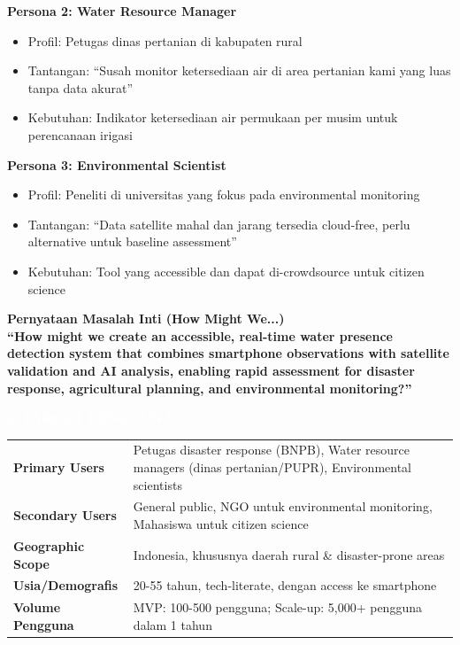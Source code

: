 \documentclass[12pt,a4paper]{article}
\newcommand{\sectionbox}[1]{%
  \colorbox{samsungblue}{%
    \parbox{\textwidth}{%
      \textcolor{white}{\large\bfseries #1}%
    }%
  }%
}
\newcommand{\subsectionbox}[1]{%
  \textbf{\large #1}\\[0.3cm]
}
\begin{document}
\textbf{Persona 2: Water Resource Manager}
\begin{itemize}
  \item Profil: Petugas dinas pertanian di kabupaten rural
  \item Tantangan: ``Susah monitor ketersediaan air di area pertanian kami yang luas tanpa data akurat''
  \item Kebutuhan: Indikator ketersediaan air permukaan per musim untuk perencanaan irigasi
\end{itemize}

\textbf{Persona 3: Environmental Scientist}
\begin{itemize}
  \item Profil: Peneliti di universitas yang fokus pada environmental monitoring
  \item Tantangan: ``Data satellite mahal dan jarang tersedia cloud-free, perlu alternative untuk baseline assessment''
  \item Kebutuhan: Tool yang accessible dan dapat di-crowdsource untuk citizen science
\end{itemize}

\subsectionbox{Pernyataan Masalah Inti (How Might We...)}

\textbf{``How might we create an accessible, real-time water presence detection system that combines smartphone observations with satellite validation and AI analysis, enabling rapid assessment for disaster response, agricultural planning, and environmental monitoring?''}

\vspace{1cm}

\sectionbox{4. TARGET PENGGUNA}

\vspace{0.5cm}

\begin{tabularx}{\textwidth}{|l|X|}
  \hline
  \textbf{Primary Users} & Petugas disaster response (BNPB), Water resource managers (dinas pertanian/PUPR), Environmental scientists \\[0.3cm]
  \textbf{Secondary Users} & General public, NGO untuk environmental monitoring, Mahasiswa untuk citizen science \\[0.3cm]
  \textbf{Geographic Scope} & Indonesia, khususnya daerah rural \& disaster-prone areas \\[0.3cm]
  \textbf{Usia/Demografis} & 20-55 tahun, tech-literate, dengan access ke smartphone \\[0.3cm]
  \textbf{Volume Pengguna} & MVP: 100-500 pengguna; Scale-up: 5,000+ pengguna dalam 1 tahun \\
  \hline
\end{tabularx}
\end{document}
